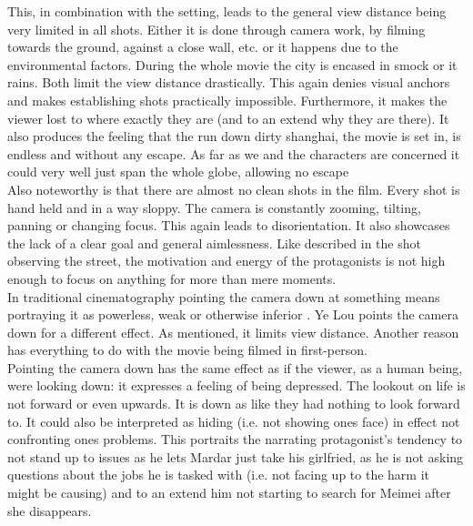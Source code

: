 \documentclass[fleqn,14pt]{article}
\begin{document}
This, in combination with the setting, leads to the general view distance being very limited in all shots.
Either it is done through camera work, by filming towards the ground, against a close wall, etc. or it happens
due to the environmental factors. During the whole movie the city is encased in smock or it rains.
Both limit the view distance drastically. This again denies visual anchors and makes establishing shots practically impossible.
Furthermore, it makes the viewer lost to where exactly they are (and to an extend why they are there). It also
produces the feeling that the run down dirty shanghai, the movie is set in, is endless and without any escape. As
far as we and the characters are concerned it could very well just span the whole globe, allowing no escape\\

Also noteworthy is that there are almost no clean shots in the film.
Every shot is hand held and in a way sloppy. The camera is constantly zooming, tilting, panning or changing
focus. This again leads to disorientation. It also showcases the lack of a clear goal and general aimlessness.
Like described in the shot observing the street, the motivation and energy of the protagonists is not high enough 
to focus on anything for more than mere moments.\\

In traditional cinematography pointing the camera down at something means portraying it as powerless, weak or
otherwise inferior \cite[p. 192]{Bordwell}. Ye Lou points the camera down for a different effect. As mentioned, it 
limits view distance. Another reason has everything to do with the movie being filmed in first-person.\\
Pointing the camera down has the same effect as if the viewer, as a human being, were looking down: it expresses 
a feeling of being depressed.
The lookout on life is not forward or even upwards. It is down as like they had nothing to look forward to.
It could also be interpreted as hiding (i.e. not showing ones face) in effect not confronting ones problems.
This portraits the narrating protagonist's tendency to not stand up to issues
as he lets Mardar just take his girlfried, as he is not asking questions about the jobs he is tasked with (i.e. not facing
up to the harm it might be causing) and to an extend him not starting to search for Meimei after she disappears.\\
\end{document}
